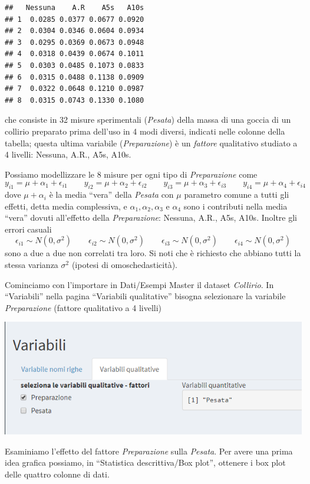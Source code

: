 \documentclass[
  11pt,
]{book}
\begin{document}
\begin{verbatim}
##   Nessuna    A.R    A5s   A10s
## 1  0.0285 0.0377 0.0677 0.0920
## 2  0.0304 0.0346 0.0604 0.0934
## 3  0.0295 0.0369 0.0673 0.0948
## 4  0.0318 0.0439 0.0674 0.1011
## 5  0.0303 0.0485 0.1073 0.0833
## 6  0.0315 0.0488 0.1138 0.0909
## 7  0.0322 0.0648 0.1210 0.0987
## 8  0.0315 0.0743 0.1330 0.1080
\end{verbatim}

che consiste in 32 misure sperimentali (\emph{Pesata}) della massa di una goccia di un collirio preparato prima dell'uso in 4
modi diversi, indicati nelle colonne della tabella; questa ultima variabile (\emph{Preparazione}) è un \emph{fattore} qualitativo studiato a 4 livelli: Nessuna, A.R., A5s, A10s.

Possiamo modellizzare le 8 misure per ogni tipo di \emph{Preparazione} come
\[
y_{i1}=\mu+\alpha_1+\epsilon_{i1} \qquad y_{i2}=\mu+\alpha_2+\epsilon_{i2} \qquad y_{i3}=\mu+\alpha_3+\epsilon_{i3} \qquad y_{i4}=\mu+\alpha_4+\epsilon_{i4}
\]
dove \(\mu+\alpha_i\) è la media ``vera'' della \emph{Pesata} con \(\mu\) parametro comune a tutti gli effetti, detta media complessiva, e \(\alpha_1, \alpha_2, \alpha_3\) e \(\alpha_4\) sono i contributi nella media ``vera'' dovuti all'effetto della \emph{Preparazione}: Nessuna, A.R., A5s, A10s. Inoltre gli errori casuali
\[
\epsilon_{i1}\sim N(0,\sigma^2) \qquad \epsilon_{i2}\sim N(0,\sigma^2) \qquad \epsilon_{i3}\sim N(0,\sigma^2) \qquad \epsilon_{i4}\sim N(0,\sigma^2)
\]
sono a due a due non correlati tra loro. Si noti che è richiesto che abbiano tutti la stessa varianza \(\sigma^2\) (ipotesi di omoschedasticità).

Cominciamo con l'importare in Dati/Esempi Master il dataset \emph{Collirio}. In ``Variabili'' nella pagina ``Variabili qualitative'' bisogna selezionare la variabile \emph{Preparazione} (fattore qualitativo a 4 livelli)

\begin{center}\includegraphics[width=0.5\linewidth]{Immagini/Anova/01_var_quali} \end{center}

Esaminiamo l'effetto del fattore \emph{Preparazione} sulla \emph{Pesata}. Per avere una prima idea grafica possiamo, in ``Statistica descrittiva/Box plot'', ottenere i box plot delle quattro colonne di dati.
\end{document}

